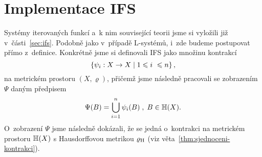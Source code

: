 \section{Implementace IFS}\label{sec:implementace-ifs}

Systémy iterovaných funkcí a~k nim související teorii jsme si vyložili již v~části~\ref{sec:ifs}. Podobně jako v~případě L-systémů, i~zde budeme postupovat přímo z~definice. Konkrétně jsme si definovali IFS jako množinu kontrakcí
\[\left\{\psi_i:X \rightarrow X\mid 1\leqslant i~\leqslant n\right\},\]
na metrickém prostoru $(X,\varrho)$, přičemž jsme následně pracovali se zobrazením $\Psi$ daným předpisem
\[\Psi(B)=\bigcup_{i=1}^n\psi_i(B)\;,\;B\in\mathbb{H}(X).\]
O~zobrazení $\Psi$ jsme následně dokázali, že se jedná o~kontrakci na metrickém prostoru $\mathbb{H}(X)$ s Hausdorffovou metrikou $\varrho_\textup{H}$ (viz věta~\ref{thm:sjednoceni-kontrakci}).


